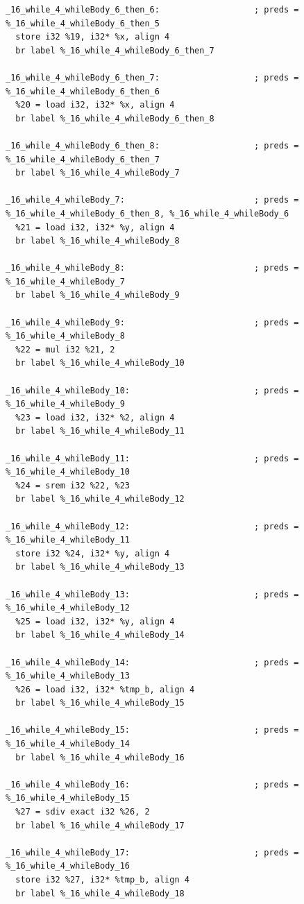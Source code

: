 \documentclass[12pt,a4paper]{article}
\begin{document}
\begin{verbatim}
_16_while_4_whileBody_6_then_6:                   ; preds = %_16_while_4_whileBody_6_then_5
  store i32 %19, i32* %x, align 4
  br label %_16_while_4_whileBody_6_then_7

_16_while_4_whileBody_6_then_7:                   ; preds = %_16_while_4_whileBody_6_then_6
  %20 = load i32, i32* %x, align 4
  br label %_16_while_4_whileBody_6_then_8

_16_while_4_whileBody_6_then_8:                   ; preds = %_16_while_4_whileBody_6_then_7
  br label %_16_while_4_whileBody_7

_16_while_4_whileBody_7:                          ; preds = %_16_while_4_whileBody_6_then_8, %_16_while_4_whileBody_6
  %21 = load i32, i32* %y, align 4
  br label %_16_while_4_whileBody_8

_16_while_4_whileBody_8:                          ; preds = %_16_while_4_whileBody_7
  br label %_16_while_4_whileBody_9

_16_while_4_whileBody_9:                          ; preds = %_16_while_4_whileBody_8
  %22 = mul i32 %21, 2
  br label %_16_while_4_whileBody_10

_16_while_4_whileBody_10:                         ; preds = %_16_while_4_whileBody_9
  %23 = load i32, i32* %2, align 4
  br label %_16_while_4_whileBody_11

_16_while_4_whileBody_11:                         ; preds = %_16_while_4_whileBody_10
  %24 = srem i32 %22, %23
  br label %_16_while_4_whileBody_12

_16_while_4_whileBody_12:                         ; preds = %_16_while_4_whileBody_11
  store i32 %24, i32* %y, align 4
  br label %_16_while_4_whileBody_13

_16_while_4_whileBody_13:                         ; preds = %_16_while_4_whileBody_12
  %25 = load i32, i32* %y, align 4
  br label %_16_while_4_whileBody_14

_16_while_4_whileBody_14:                         ; preds = %_16_while_4_whileBody_13
  %26 = load i32, i32* %tmp_b, align 4
  br label %_16_while_4_whileBody_15

_16_while_4_whileBody_15:                         ; preds = %_16_while_4_whileBody_14
  br label %_16_while_4_whileBody_16

_16_while_4_whileBody_16:                         ; preds = %_16_while_4_whileBody_15
  %27 = sdiv exact i32 %26, 2
  br label %_16_while_4_whileBody_17

_16_while_4_whileBody_17:                         ; preds = %_16_while_4_whileBody_16
  store i32 %27, i32* %tmp_b, align 4
  br label %_16_while_4_whileBody_18


\end{verbatim}
\end{document}
